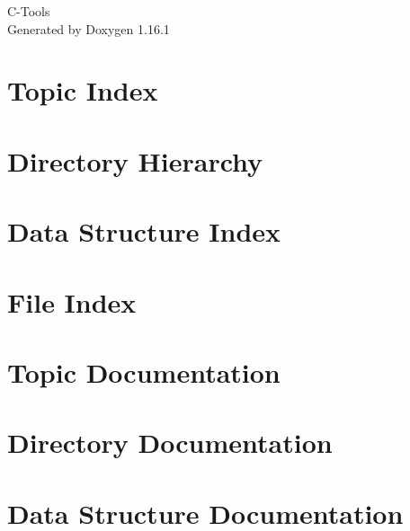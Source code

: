 \documentclass[twoside]{book}
\newcommand{\+}{\discretionary{\mbox{\scriptsize$\hookleftarrow$}}{}{}}
\newcommand{\clearemptydoublepage}{%
    \newpage{\pagestyle{empty}\cleardoublepage}%
  }
\begin{document}
  \raggedbottom
    \hypersetup{pageanchor=false,
                bookmarksnumbered=true,
                pdfencoding=unicode
               }
  \begin{titlepage}
  \vspace*{7cm}
  \begin{center}%
  {\Large C-\/\+Tools}\\
  \vspace*{1cm}
  {\large Generated by Doxygen 1.16.1}\\
  \end{center}
  \end{titlepage}
  \clearemptydoublepage
  \tableofcontents
  \clearemptydoublepage
  \hypersetup{pageanchor=true}
\chapter{Topic Index}

\chapter{Directory Hierarchy}

\chapter{Data Structure Index}

\chapter{File Index}

\chapter{Topic Documentation}


\chapter{Directory Documentation}





\chapter{Data Structure Documentation}


\end{document}
